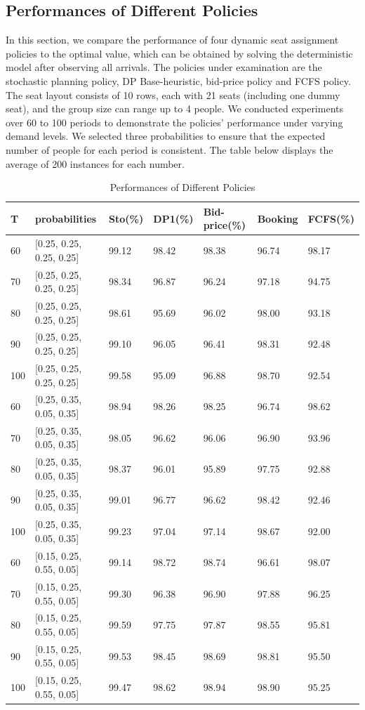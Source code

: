 \subsection{Performances of Different Policies}
In this section, we compare the performance of four dynamic seat assignment policies to the optimal value, which can be obtained by solving the deterministic model after observing all arrivals. The policies under examination are the stochastic planning policy, DP Base-heuristic, bid-price policy and FCFS policy. The seat layout consists of 10 rows, each with 21 seats (including one dummy seat), and the group size can range up to 4 people. We conducted experiments over 60 to 100 periods to demonstrate the policies' performance under varying demand levels. We selected three probabilities to ensure that the expected number of people for each period is consistent. The table below displays the average of 200 instances for each number.

\begin{table}[ht]
  \centering
  \caption{Performances of Different Policies}
  \begin{tabular}{|l|l|l|l|l|l|l|}
  \hline
   T & probabilities & Sto(\%) & DP1(\%) & Bid-price(\%) & Booking & FCFS(\%) \\
  \hline
   60  & [0.25, 0.25, 0.25, 0.25]  & 99.12 & 98.42 & 98.38 & 96.74 & 98.17 \\
   70  & [0.25, 0.25, 0.25, 0.25]  & 98.34 & 96.87 & 96.24 & 97.18 & 94.75 \\
   80  & [0.25, 0.25, 0.25, 0.25]  & 98.61 & 95.69 & 96.02 & 98.00 & 93.18 \\
   90  & [0.25, 0.25, 0.25, 0.25]  & 99.10 & 96.05 & 96.41 & 98.31 & 92.48 \\
   100 & [0.25, 0.25, 0.25, 0.25]  & 99.58 & 95.09 & 96.88 & 98.70 & 92.54 \\
   \hline
   60  & [0.25, 0.35, 0.05, 0.35]  & 98.94 & 98.26 & 98.25 & 96.74 & 98.62 \\
   70  & [0.25, 0.35, 0.05, 0.35]  & 98.05 & 96.62 & 96.06 & 96.90 & 93.96 \\
   80  & [0.25, 0.35, 0.05, 0.35]  & 98.37 & 96.01 & 95.89 & 97.75 & 92.88 \\
   90  & [0.25, 0.35, 0.05, 0.35]  & 99.01 & 96.77 & 96.62 & 98.42 & 92.46 \\
   100 & [0.25, 0.35, 0.05, 0.35]  & 99.23 & 97.04 & 97.14 & 98.67 & 92.00 \\
  \hline
  60  & [0.15, 0.25, 0.55, 0.05]  & 99.14 & 98.72 & 98.74 & 96.61 & 98.07 \\
  70  & [0.15, 0.25, 0.55, 0.05]  & 99.30 & 96.38 & 96.90 & 97.88 & 96.25 \\
  80  & [0.15, 0.25, 0.55, 0.05]  & 99.59 & 97.75 & 97.87 & 98.55 & 95.81 \\
  90  & [0.15, 0.25, 0.55, 0.05]  & 99.53 & 98.45 & 98.69 & 98.81 & 95.50 \\
  100 & [0.15, 0.25, 0.55, 0.05]  & 99.47 & 98.62 & 98.94 & 98.90 & 95.25 \\
  \hline
  \end{tabular}
\end{table}

